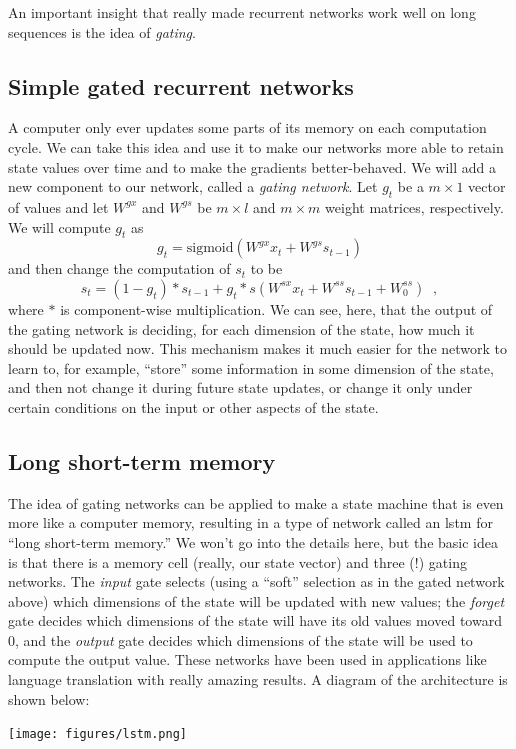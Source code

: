 An important insight that really made recurrent networks work well on
long sequences is the idea of {\em gating}.

\subsection{Simple gated recurrent networks}

A computer only ever updates some parts of its memory on each
computation cycle.  We can take this idea and use it to make our
networks more able to retain state values over time and to make the
gradients better-behaved.  We will add a new component to our network,
called a {\em gating network}.  Let $g_t$ be a $m \times 1$ vector of
values and let $W^{gx}$ and $W^{gs}$ be $m \times l$ and $m \times m$
weight matrices, respectively.  We will compute $g_t$ as
\begin{equation}
g_t = \text{sigmoid}(W^{gx} x_t + W^{gs} s_{t-1})
\end{equation}
and then change the computation of $s_t$ to be
\begin{equation}
s_t = (1 - g_t) *  s_{t-1} + g_t * s(W^{sx}x_t + W^{ss}
  s_{t-1} + W^{ss}_0)\;\;,
\end{equation}
where $*$ is component-wise multiplication.  We can see, here, that
the output of the gating network is deciding, for each dimension of
the state, how much it should be updated now.  This mechanism makes it
much easier for the network to learn to,  for example, ``store'' some
information in some dimension of the state, and then not change it
during future state updates, or change it only under certain
conditions on the input or other aspects of the state.

\subsection{Long short-term memory}

The idea of gating networks can be applied to make a state machine
that is even more like a computer memory, resulting in a type of
network called an {\sc  lstm} for ``long short-term memory.''
  We won't go
into the details here,  but the basic idea is that there is a memory
cell (really, our state vector) and three (!) gating networks.  The
{\em input} gate selects (using a ``soft''  selection as in the gated
network above) which dimensions of the state will be updated  with new
values;  the {\em forget} gate decides which dimensions of the state
will have its old values  moved toward 0, and the {\em  output} gate
decides which dimensions of the state will be used to compute the
output value.  These networks have been used in applications like
language translation with really amazing results.  A diagram of the 
architecture is shown below:
\begin{center}
\texttt{[image: figures/lstm.png]}
\end{center}


